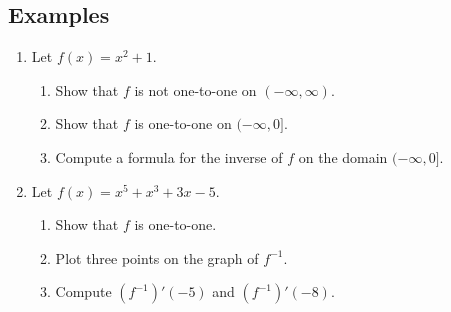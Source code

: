 \documentclass[11pt]{article}
\theoremstyle{definition}
\theoremstyle{named}
\numberwithin{myalgctr}{section}
\begin{document}
\subsection*{Examples}
\begin{enumerate}
  \item Let $f(x)=x^2+1$.
  \begin{enumerate}
    \item Show that $f$ is not one-to-one on $(-\infty, \infty)$.
    \item Show that $f$ is one-to-one on $(-\infty, 0]$.
    \item Compute a formula for the inverse of $f$ on the domain $(-\infty, 0]$. 
  \end{enumerate}
  \item Let $f(x)=x^5+x^3+3x-5$.
  \begin{enumerate}
    \item Show that $f$ is one-to-one.
    \item Plot three points on the graph of $f^{-1}$.
    \item Compute $(f^{-1})'(-5)$ and $(f^{-1})'(-8)$.
  \end{enumerate}
\end{enumerate}
\end{document}
